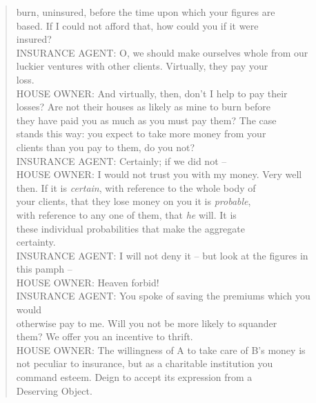 \documentclass[11pt]{article}
\begin{document}
\begin{quote}
      burn, uninsured, before the time upon which your figures are \\
      based.  If I could not afford that, how could you if it were \\
      insured? \\
  INSURANCE AGENT:  O, we should make ourselves whole from our \\
      luckier ventures with other clients.  Virtually, they pay your \\
      loss. \\
  HOUSE OWNER:  And virtually, then, don't I help to pay their \\
      losses?  Are not their houses as likely as mine to burn before \\
      they have paid you as much as you must pay them?  The case \\
      stands this way:  you expect to take more money from your \\
      clients than you pay to them, do you not? \\
  INSURANCE AGENT:  Certainly; if we did not -- \\
  HOUSE OWNER:  I would not trust you with my money.  Very well \\
      then.  If it is {\em certain}, with reference to the whole body of \\
      your clients, that they lose money on you it is {\em probable}, \\
      with reference to any one of them, that {\em he} will.  It is \\
      these individual probabilities that make the aggregate \\
      certainty. \\
  INSURANCE AGENT:  I will not deny it -- but look at the figures in \\
      this pamph -- \\
  HOUSE OWNER:  Heaven forbid! \\
  INSURANCE AGENT:  You spoke of saving the premiums which you would \\
      otherwise pay to me.  Will you not be more likely to squander \\
      them?  We offer you an incentive to thrift. \\
  HOUSE OWNER:  The willingness of A to take care of B's money is \\
      not peculiar to insurance, but as a charitable institution you \\
      command esteem.  Deign to accept its expression from a \\
      Deserving Object.  \end{quote}
\end{document}
